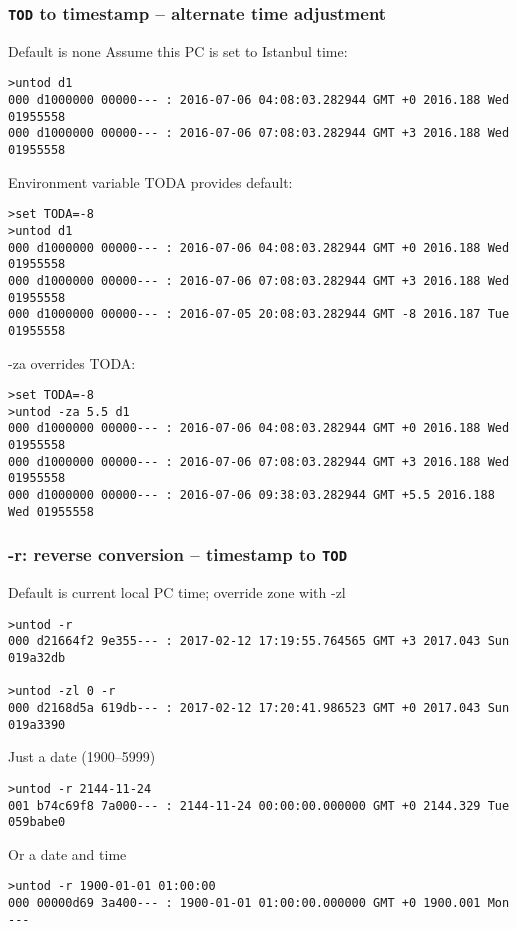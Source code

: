 \documentclass[10pt,xcolor=x11names]{beamer}
\newcommand{\tod}{\texttt{TOD}}
\begin{document}
\begin{frame}[fragile]
  \frametitle{\tod{} to timestamp -- alternate time adjustment}
  \begin{block}{Default is none}
Assume this PC is set to Istanbul time:
  \begin{lstlisting}
>untod d1
000 d1000000 00000--- : 2016-07-06 04:08:03.282944 GMT +0 2016.188 Wed 01955558
000 d1000000 00000--- : 2016-07-06 07:08:03.282944 GMT +3 2016.188 Wed 01955558
  \end{lstlisting}
  \end{block}
  \begin{block}{Environment variable TODA provides default:}
  \begin{lstlisting}
>set TODA=-8
>untod d1
000 d1000000 00000--- : 2016-07-06 04:08:03.282944 GMT +0 2016.188 Wed 01955558
000 d1000000 00000--- : 2016-07-06 07:08:03.282944 GMT +3 2016.188 Wed 01955558
000 d1000000 00000--- : 2016-07-05 20:08:03.282944 GMT -8 2016.187 Tue 01955558
  \end{lstlisting}
  \end{block}
  \begin{block}{-za overrides TODA:}
  \begin{lstlisting}
>set TODA=-8
>untod -za 5.5 d1
000 d1000000 00000--- : 2016-07-06 04:08:03.282944 GMT +0 2016.188 Wed 01955558
000 d1000000 00000--- : 2016-07-06 07:08:03.282944 GMT +3 2016.188 Wed 01955558
000 d1000000 00000--- : 2016-07-06 09:38:03.282944 GMT +5.5 2016.188 Wed 01955558
  \end{lstlisting}
  \end{block}

\end{frame}

\begin{frame}[fragile]
  \frametitle{-r: reverse conversion -- timestamp to \tod{}}
  \begin{block}{Default is current local PC time; override zone with -zl}
  \begin{lstlisting}
>untod -r
000 d21664f2 9e355--- : 2017-02-12 17:19:55.764565 GMT +3 2017.043 Sun 019a32db

>untod -zl 0 -r
000 d2168d5a 619db--- : 2017-02-12 17:20:41.986523 GMT +0 2017.043 Sun 019a3390
  \end{lstlisting}
  \end{block}
  \begin{block}{Just a date (1900--5999)}
  \begin{lstlisting}
>untod -r 2144-11-24
001 b74c69f8 7a000--- : 2144-11-24 00:00:00.000000 GMT +0 2144.329 Tue 059babe0
  \end{lstlisting}
  \end{block}
  \begin{block}{Or a date and time}
  \begin{lstlisting}
>untod -r 1900-01-01 01:00:00
000 00000d69 3a400--- : 1900-01-01 01:00:00.000000 GMT +0 1900.001 Mon ---
  \end{lstlisting}
  \end{block}

\end{frame}
\end{document}

